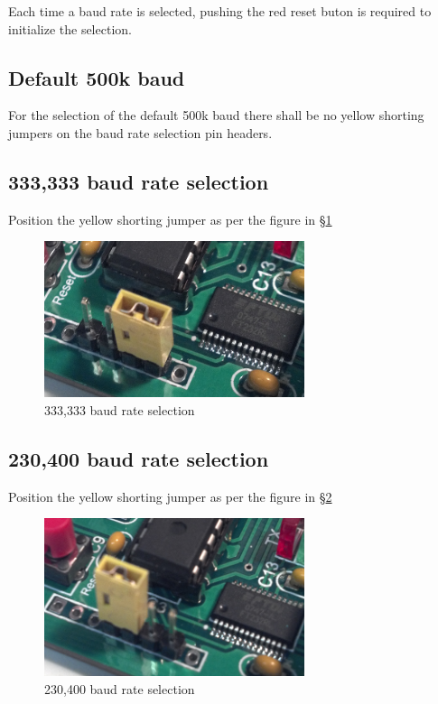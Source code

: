 \documentclass[15pt]{book}
\begin{document}
Each time a baud rate is selected, pushing the red reset buton is required to initialize the selection.

\subsection{Default 500k baud}
For the selection of the default 500k baud there shall be no yellow shorting jumpers on the baud rate selection pin headers.

\subsection{333,333 baud rate selection}
Position the yellow shorting jumper as per the figure in \S\ref{333333}
\begin{figure}[htbp]
\begin{center}
\includegraphics[width=3in]{images/333333_baud.png}
\caption{333,333 baud rate selection}
\label{333333}
\end{center}
\end{figure}


\subsection{230,400 baud rate selection}
Position the yellow shorting jumper as per the figure in \S\ref{230400}
\begin{figure}[htbp]
\begin{center}
\includegraphics[width=3in]{images/230400_baud.png}
\caption{230,400 baud rate selection}
\label{230400}
\end{center}
\end{figure}
\end{document}

